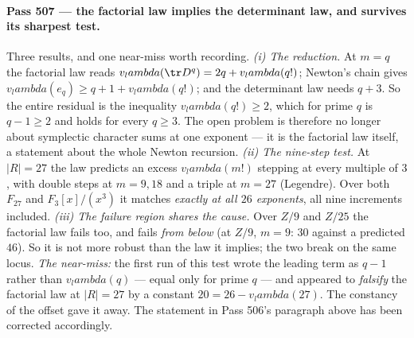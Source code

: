 \documentclass[12pt,a4paper]{article}
\def\mathbb#1{#1}%
\def\textbf#1{#1}%
\def\lambda{lambda}%
\theoremstyle{definition}
\newcommand{\FF}{\mathbb{F}}
\newcommand{\ZZ}{\mathbb{Z}}
\begin{document}
\paragraph{Pass 507 --- the factorial law implies the determinant law, and
survives its sharpest test.}
Three results, and one near-miss worth recording.  \emph{(i) The reduction.}
At $m=q$ the factorial law reads $v_\lambda(\tr D^q)=2q+v_\lambda(q!)$; Newton's
chain gives $v_\lambda(e_q)\ge q+1+v_\lambda(q!)$; and the determinant law needs
$q+3$.  So \textbf{the entire residual is the inequality $v_\lambda(q!)\ge2$},
which for prime $q$ is $q-1\ge2$ and holds for every $q\ge3$.  The open problem
is therefore no longer about symplectic character sums at one exponent --- it
is the factorial law itself, a statement about the whole Newton recursion.
\emph{(ii) The nine-step test.}  At $|R|=27$ the law predicts an excess
$v_\lambda(m!)$ stepping at every multiple of $3$, with double steps at $m=9,18$
and a triple at $m=27$ (Legendre).  Over both $\FF_{27}$ and $\FF_3[x]/(x^3)$
it matches \emph{exactly at all $26$ exponents}, all nine increments included.
\emph{(iii) The failure region shares the cause.}  Over $\ZZ/9$ and $\ZZ/25$ the
factorial law fails too, and fails \emph{from below} (at $\ZZ/9$, $m=9$: $30$
against a predicted $46$).  So it is not more robust than the law it implies;
the two break on the same locus.  \emph{The near-miss:} the first run of this
test wrote the leading term as $q-1$ rather than $v_\lambda(q)$ --- equal only
for prime $q$ --- and appeared to \emph{falsify} the factorial law at $|R|=27$
by a constant $20=26-v_\lambda(27)$.  The constancy of the offset gave it away.
The statement in Pass 506's paragraph above has been corrected accordingly.
\end{document}
